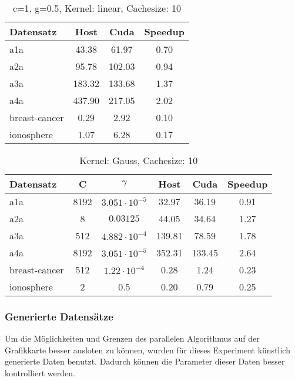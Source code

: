 \documentclass[ngerman]{scrartcl}
\begin{document}
\begin{table}
\begin{center}
\begin{tabular}{|l|c|c|c|}
\hline
Datensatz & Host & Cuda & Speedup \\
\hline
a1a & 43.38 & 61.97 & 0.70 \\
a2a & 95.78 & 102.03 & 0.94 \\
a3a & 183.32 & 133.68 & 1.37 \\
a4a & 437.90 & 217.05 & 2.02 \\
breast-cancer & 0.29 & 2.92 & 0.10 \\
ionosphere & 1.07 & 6.28 & 0.17 \\
\hline
\end{tabular}
\end{center}
\caption{ c=1, g=0.5, Kernel: linear, Cachesize: 10}
\label{tbl:normal-c1-g5-linear-10}
\end{table}

\begin{table}
\begin{center}
\begin{tabular}{|l|c|c|c|c|c|}
\hline
Datensatz & C & $\gamma$ & Host & Cuda & Speedup \\
\hline
a1a & 8192 & $3.051 \cdot 10^{-5}$ & 32.97 & 36.19 & 0.91 \\
a2a & 8 & $0.03125$ & 44.05 & 34.64 & 1.27 \\
a3a & 512 & $4.882 \cdot 10^{-4}$ & 139.81 & 78.59 & 1.78 \\
a4a & 8192 & $3.051 \cdot 10^{-5}$ & 352.31 & 133.45 & 2.64 \\
breast-cancer & 512 & $1.22 \cdot 10^{-4}$ & 0.28 & 1.24 & 0.23 \\
ionosphere & 2 & 0.5 & 0.20 & 0.79 & 0.25 \\
\hline
\end{tabular}
\end{center}
\caption{ Kernel: Gauss, Cachesize: 10}
\label{tbl:normal-libsvmbest-gauss-10}
\end{table}


\subsubsection{Generierte Datensätze}
\label{gendata}
Um die Möglichkeiten und Grenzen des parallelen Algorithmus auf der Grafikkarte besser ausloten zu können, wurden für dieses Experiment künstlich generierte Daten benutzt.
Dadurch können die Parameter dieser Daten besser kontrolliert werden.
\end{document}
